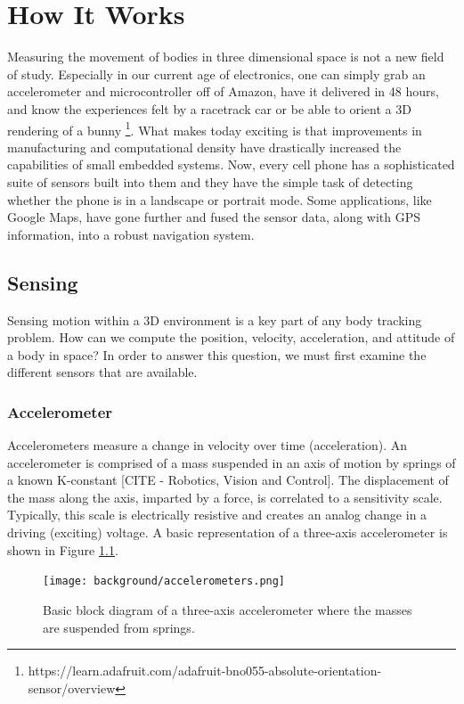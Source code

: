 \chapter{How  It Works}\label{chap:background}
Measuring the movement of bodies in three dimensional space is not a new field of study.
Especially in our current age of electronics, one can simply grab an accelerometer and microcontroller off of Amazon, have it delivered in 48 hours, and know the experiences felt by a racetrack car or be able to orient a 3D rendering of a bunny \footnote[1]{https://learn.adafruit.com/adafruit-bno055-absolute-orientation-sensor/overview}.
What makes today exciting is that improvements in manufacturing and computational density have drastically increased the capabilities of small embedded systems.
Now, every cell phone has a sophisticated suite of sensors built into them and they have the simple task of detecting whether the phone is in a landscape or portrait mode. 
Some applications, like Google Maps, have gone further and fused the sensor data, along with GPS information, into a robust navigation system.

\section{Sensing} \label{sec:bkg_imu}
Sensing motion within a 3D environment is a key part of any body tracking problem.
How can we compute the position, velocity, acceleration, and attitude of a body in space?
In order to answer this question, we must first examine the different sensors that are available.

\subsection{Accelerometer} \label{ssec:bkg_accelerometer}
Accelerometers measure a change in velocity over time (acceleration).
An accelerometer is comprised of a mass suspended in an axis of motion by springs of a known K-constant [CITE - Robotics, Vision and Control].
The displacement of the mass along the axis, imparted by a force, is correlated to a sensitivity scale.
Typically, this scale is electrically resistive and creates an analog change in a driving (exciting) voltage.
A basic representation of a three-axis accelerometer is shown in Figure \ref{fig:accelerometers}.

\begin{figure}[h!]
    \caption[Accelerometer block diagram]{Basic block diagram of a three-axis accelerometer where the masses are suspended from springs.}
    \label{fig:accelerometers}
    \centering
    \texttt{[image: background/accelerometers.png]}
\end{figure}

